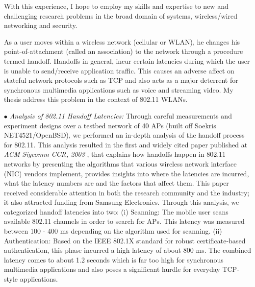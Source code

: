 \documentclass[10pt,letterpaper]{article}
\begin{document}
With this experience, I hope to employ my skills and expertise to new and challenging research problems in the broad
domain of systems, wireless/wired networking and security.

 As a user moves within a wireless
network (cellular or WLAN), he changes his point-of-attachment (called an association) to the network through a
procedure termed handoff. Handoffs in general, incur certain latencies during which the user is unable to send/receive
application traffic. This causes an adverse affect on stateful network protocols such as TCP and also acts as a major
deterrent for synchronous multimedia applications such as voice and streaming video. My thesis address this problem in
the context of 802.11 WLANs.  


$\bullet$ {\it Analysis of 802.11 Handoff Latencies:} Through careful measurements and experiment designs over
a testbed network  of 40 APs (built off Soekris NET4521/OpenBSD), we performed an in-depth analysis of the handoff
process for 802.11. This analysis resulted in the first and  widely cited paper published at {\it ACM Sigcomm CCR,
2003 }, that explains how handoffs happen in 802.11 networks by presenting the algorithms that various wireless network
interface (NIC) vendors implement, provides insights into where the latencies are incurred, what the latency numbers are
and the factors that affect them. This paper received considerable attention in both the research community and the
industry; it also attracted funding from Samsung Electronics.
Through this analysis, we categorized handoff latencies into two: (i) Scanning: The mobile user scans available 802.11
channels in order to search for APs. This latency was measured between 100 - 400 ms depending on the algorithm
used for scanning. (ii) Authentication: Based on the IEEE 802.1X standard for robust certificate-based authentication,
this phase incurred a high latency of about 800 ms. The combined latency comes to about 1.2 seconds which is far
too high for synchronous multimedia applications and also poses a significant hurdle for everyday TCP-style
applications. 
\end{document}
